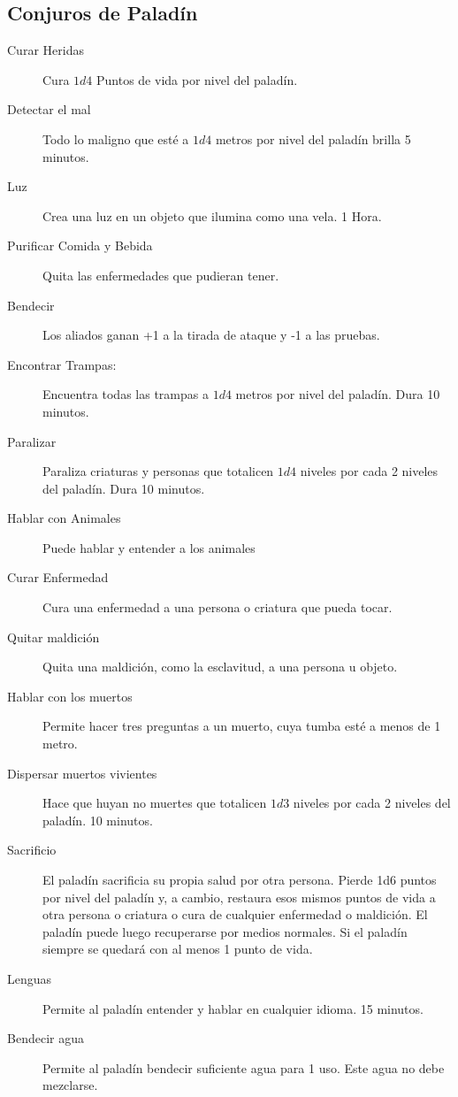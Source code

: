 \begin{multicols}{2}
\section{Conjuros de Paladín}

\begin{description}
\item[Curar Heridas] Cura $1d4$ Puntos de vida por nivel del paladín.
\item[Detectar el mal] Todo lo maligno que esté a $1d4$ metros por nivel del paladín brilla 5 minutos.
\item[Luz] Crea una luz en un objeto que ilumina como una vela. 1 Hora.
\item[Purificar Comida y Bebida] Quita las enfermedades que pudieran tener.
\item[Bendecir] Los aliados ganan +1 a la tirada de ataque y -1 a las pruebas.
\item[Encontrar Trampas:] Encuentra todas las trampas a $ 1d4$ metros por nivel del paladín. Dura 10 minutos.
\item[Paralizar] Paraliza criaturas y personas que totalicen $ 1d4$ niveles por cada 2 niveles del paladín. Dura 10 minutos.
\item[Hablar con Animales] Puede hablar y entender a los animales
\item[Curar Enfermedad] Cura una enfermedad a una persona o criatura que pueda tocar.
\item[Quitar maldición] Quita una maldición, como la esclavitud, a una persona u objeto.
\item[Hablar con los muertos] Permite hacer tres preguntas a un muerto, cuya tumba esté a menos de 1 metro.
\item[Dispersar muertos vivientes] Hace que huyan no muertes que totalicen $ 1d3$ niveles por cada 2 niveles del paladín. 10 minutos.
\item[Sacrificio] El paladín sacrificia su propia salud por otra persona. Pierde 1d6 puntos por nivel del paladín y, a cambio, restaura esos mismos puntos de vida a otra persona o criatura o cura de cualquier enfermedad o maldición. El paladín puede luego recuperarse por medios normales. Si el paladín siempre se quedará con  al menos 1 punto de vida.
\item[Lenguas] Permite al paladín entender y hablar en cualquier idioma. 15 minutos.
\item[Bendecir agua] Permite al paladín bendecir suficiente agua para 1 uso. Este agua no debe mezclarse.
\end{description}


\end{multicols}
